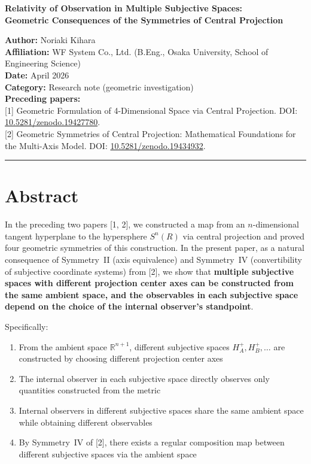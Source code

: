 \documentclass[a4paper,11pt]{article}
\theoremstyle{definition}
\begin{document}
\begin{center}
{\LARGE\bfseries Relativity of Observation in Multiple Subjective Spaces:\\Geometric Consequences of the Symmetries of Central Projection}
\end{center}

\bigskip

\noindent\textbf{Author:} Noriaki Kihara\\
\textbf{Affiliation:} WF System Co., Ltd. (B.Eng., Osaka University, School of Engineering Science)\\
\textbf{Date:} April 2026\\
\textbf{Category:} Research note (geometric investigation)\\
\textbf{Preceding papers:}\\
{[1]} Geometric Formulation of 4-Dimensional Space via Central Projection. DOI: \href{https://doi.org/10.5281/zenodo.19427780}{10.5281/zenodo.19427780}.\\
{[2]} Geometric Symmetries of Central Projection: Mathematical Foundations for the Multi-Axis Model. DOI: \href{https://doi.org/10.5281/zenodo.19434932}{10.5281/zenodo.19434932}.

\bigskip\hrule\bigskip

\section*{Abstract}

In the preceding two papers {[1, 2]}, we constructed a map from an \(n\)-dimensional tangent hyperplane to the hypersphere \(S^n(R)\) via central projection and proved four geometric symmetries of this construction. In the present paper, as a natural consequence of Symmetry~II (axis equivalence) and Symmetry~IV (convertibility of subjective coordinate systems) from {[2]}, we show that \textbf{multiple subjective spaces with different projection center axes can be constructed from the same ambient space, and the observables in each subjective space depend on the choice of the internal observer's standpoint}.

Specifically:

\begin{enumerate}
\item From the ambient space \(\mathbb{R}^{n+1}\), different subjective spaces \(H_A^+, H_B^+, \ldots\) are constructed by choosing different projection center axes
\item The internal observer in each subjective space directly observes only quantities constructed from the metric
\item Internal observers in different subjective spaces share the same ambient space while obtaining different observables
\item By Symmetry~IV of {[2]}, there exists a regular composition map between different subjective spaces via the ambient space
\end{enumerate}
\end{document}

